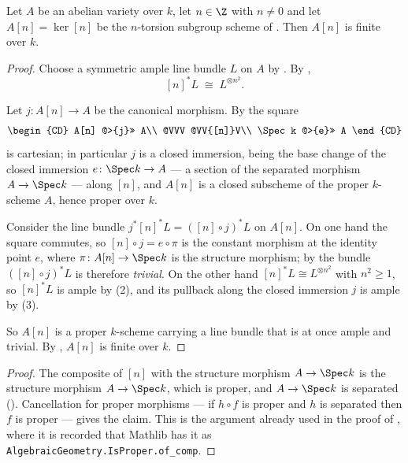 \begin{lemma}\label{lem:deg-torsion-finite}
Let $A$ be an abelian variety over $k$, let $n\in\Z$ with $n\neq0$ and let
$A[n]=\ker[n]$ be the $n$-torsion subgroup scheme of .
Then $A[n]$ is finite over $k$.
\end{lemma}
\begin{proof}
Choose a symmetric ample line bundle $L$ on $A$ by
.  By ,
\[
  [n]^*L\;\cong\;L^{\otimes n^2}.
\]

Let $j\colon A[n]\to A$ be the canonical morphism.  By
 the square
\[
  \begin{CD}
    A[n]      @>{j}>>  A\\
    @VVV               @VV{[n]}V\\
    \Spec k   @>{e}>>  A
  \end{CD}
\]
is cartesian; in particular $j$ is a closed immersion, being the base change of
the closed immersion $e\colon\Spec k\to A$ --- a section of the separated
morphism $A\to\Spec k$ --- along $[n]$, and $A[n]$ is a closed subscheme of the
proper $k$-scheme $A$, hence proper over $k$.

Consider the line bundle $j^*[n]^*L=([n]\circ j)^*L$ on $A[n]$.  On one hand
the square commutes, so $[n]\circ j=e\circ\pi$ is the constant morphism at the
identity point $e$, where $\pi\colon A[n]\to\Spec k$ is the structure
morphism; by  the bundle
$([n]\circ j)^*L$ is therefore \emph{trivial}.  On the other hand
$[n]^*L\cong L^{\otimes n^2}$ with $n^2\geq1$, so $[n]^*L$ is ample by
(2), and its pullback along the closed immersion $j$
is ample by (3).

So $A[n]$ is a proper $k$-scheme carrying a line bundle that is at once ample
and trivial.  By , $A[n]$ is finite over
$k$.
\end{proof}

\begin{proof}
The composite of $[n]$ with the structure morphism $A\to\Spec k$ is the
structure morphism $A\to\Spec k$, which is proper, and $A\to\Spec k$ is
separated ().  Cancellation for proper morphisms --- if
$h\circ f$ is proper and $h$ is separated then $f$ is proper --- gives the
claim.  This is the argument already used in the proof of
, where it is recorded that Mathlib has it
as \texttt{AlgebraicGeometry.IsProper.of\_comp}.
\end{proof}

